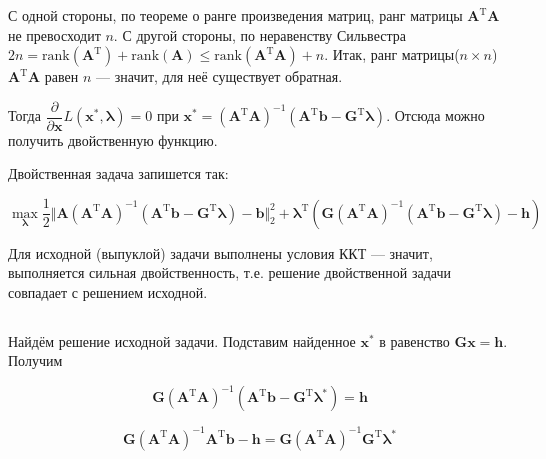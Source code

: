 	С одной стороны, по теореме о ранге произведения матриц, ранг матрицы $\mathbf{A}^{\text{T}}\mathbf{A}$ не превосходит $n$. С другой стороны, по неравенству Сильвестра $2n = \text{rank}(\mathbf{A}^{\text{T}}) + \text{rank}(\mathbf{A}) \leqslant \text{rank}(\mathbf{A}^{\text{T}}\mathbf{A}) + n$. Итак, ранг матрицы($n\times n$) $\mathbf{A}^{\text{T}}\mathbf{A}$ равен $n$ --- значит, для неё существует обратная.
	
	Тогда $\dfrac{\partial}{\partial \mathbf{x}}L(\mathbf{x}^{*},\boldsymbol{\lambda}) = 0$ при $\mathbf{x}^{*} =(\mathbf{A}^{\text{T}}\mathbf{A})^{-1}(\mathbf{A}^{\text{T}}\mathbf{b} -\mathbf{G}^{\text{T}}\boldsymbol{\lambda})$. Отсюда можно получить двойственную функцию. 
	
	Двойственная задача запишется так:
	
	\begin{equation}
	\max_{\mathbf{\lambda}} \frac 12 \Vert \mathbf{A}(\mathbf{A}^{\text{T}}\mathbf{A})^{-1}(\mathbf{A}^{\text{T}}\mathbf{b} -\mathbf{G}^{\text{T}}\boldsymbol{\lambda})-\mathbf{b} \Vert_2^2 +\boldsymbol{\lambda}^{\text{T}} \left( \mathbf{G}(\mathbf{A}^{\text{T}}\mathbf{A})^{-1}(\mathbf{A}^{\text{T}}\mathbf{b} -\mathbf{G}^{\text{T}}\boldsymbol{\lambda})-\textbf{h}\right) 
	\end{equation}
	
	Для исходной (выпуклой) задачи выполнены условия ККТ --- значит, выполняется сильная двойственность, т.е. решение двойственной задачи совпадает с решением исходной.
	 
	\subsection{}
	
	 Найдём решение исходной задачи. Подставим найденное $\mathbf{x}^{*}$ в равенство $\mathbf{G}\mathbf{x}=\mathbf{h}$. Получим
	
	\begin{equation}
	\mathbf{G}(\mathbf{A}^{\text{T}}\mathbf{A})^{-1}(\mathbf{A}^{\text{T}}\mathbf{b} -\mathbf{G}^{\text{T}}\boldsymbol{\lambda}^{*}) = \mathbf{h}
	\end{equation}
	
	\begin{equation}
	\mathbf{G}(\mathbf{A}^{\text{T}}\mathbf{A})^{-1}\mathbf{A}^{\text{T}}\mathbf{b} - \mathbf{h}=\mathbf{G}(\mathbf{A}^{\text{T}}\mathbf{A})^{-1}\mathbf{G}^{\text{T}}\boldsymbol{\lambda}^{*}
	\end{equation}
	
